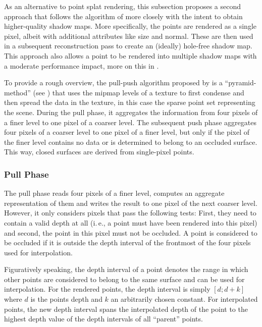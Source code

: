 As an alternative to point splat rendering, this subsection proposes a second approach that follows the algorithm of \citet{Marroquim:2007:reconstruction} more closely with the intent to obtain higher-quality shadow maps. More specifically, the points are rendered as a single pixel, albeit with additional attributes like size and normal. These are then used in a subsequent reconstruction pass to create an (ideally) hole-free shadow map. This approach also allows a point to be rendered into multiple shadow maps with a moderate performance impact, more on this in .

To provide a rough overview, the pull-push algorithm proposed by \citet{Marroquim:2007:reconstruction} is a ``pyramid-method'' (see \cite{Strengert:2006:Pyramid}) that uses the mipmap levels of a texture to first condense and then spread the data in the texture, in this case the sparse point set representing the scene. During the pull phase, it aggregates the information from four pixels of a finer level to one pixel of a coarser level. The subsequent push phase aggregates four pixels of a coarser level to one pixel of a finer level, but only if the pixel of the finer level contains no data or is determined to belong to an occluded surface. This way, closed surfaces are derived from single-pixel points.

\subsubsection{Pull Phase}
The pull phase reads four pixels of a finer level, computes an aggregate representation of them and writes the result to one pixel of the next coarser level. However, it only considers pixels that pass the following tests: First, they need to contain a valid depth at all (i.\,e., a point must have been rendered into this pixel) and second, the point in this pixel must not be occluded. A point is considered to be occluded if it is outside the depth interval of the frontmost of the four pixels used for interpolation.

Figuratively speaking, the depth interval of a point denotes the range in which other points are considered to belong to the same surface and can be used for interpolation. For the rendered points, the depth interval is simply $[d;d+k]$ where $d$ is the points depth and $k$ an arbitrarily chosen constant. For interpolated points, the new depth interval spans the interpolated depth of the point to the highest depth value of the depth intervals of all ``parent'' points.

